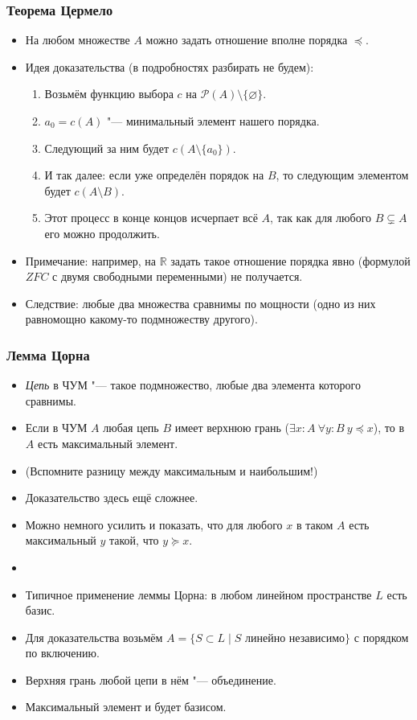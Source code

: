 \documentclass[10pt]{beamer}
\begin{document}
\begin{frame}
    \frametitle{Теорема Цермело}
    \begin{itemize}
        \item На любом множестве $A$ можно задать отношение вполне порядка $\preccurlyeq$.
        \item Идея доказательства (в подробностях разбирать не будем):
        \begin{enumerate}
            \item Возьмём функцию выбора $c$ на $\mathcal{P}(A) \setminus \{\varnothing\}$.
            \item $a_0 = c(A)$ "--- минимальный элемент нашего порядка.
            \item Следующий за ним будет $c(A \setminus \{a_0\})$.
            \item И так далее: если уже определён порядок на $B$, то следующим элементом будет $c(A \setminus B)$.
            \item Этот процесс в конце концов исчерпает всё $A$, так как для любого $B \subsetneq A$ его можно продолжить.
        \end{enumerate} 
        \item Примечание: например, на $\mathbb{R}$ задать такое отношение порядка явно (формулой $ZFC$ с двумя свободными переменными) не получается.
        \item Следствие: любые два множества сравнимы по мощности (одно из них равномощно какому-то подмножеству другого).
    \end{itemize}
\end{frame}

\begin{frame}
    \frametitle{Лемма Цорна}
    \begin{itemize}
        \item \emph{Цепь} в ЧУМ "--- такое подмножество, любые два элемента которого сравнимы.
        \item Если в ЧУМ $A$ любая цепь $B$ имеет верхнюю грань ($\exists x : A ~ \forall y : B ~ y \preccurlyeq x$), то в $A$ есть максимальный элемент.
        \item (Вспомните разницу между максимальным и наибольшим!)
        \item Доказательство здесь ещё сложнее.
        \pause
        \item Можно немного усилить и показать, что для любого $x$ в таком $A$ есть максимальный $y$ такой, что $y \succcurlyeq x$.
        \pause
        \item[]
        \item Типичное применение леммы Цорна: в любом линейном пространстве $L$ есть базис.
        \pause
        \item Для доказательства возьмём $A = \{S \subset L \mid S$ линейно независимо$\}$ с порядком по включению.
        \item Верхняя грань любой цепи в нём "--- объединение.
        \item Максимальный элемент и будет базисом.
    \end{itemize}
\end{frame}
\end{document}
